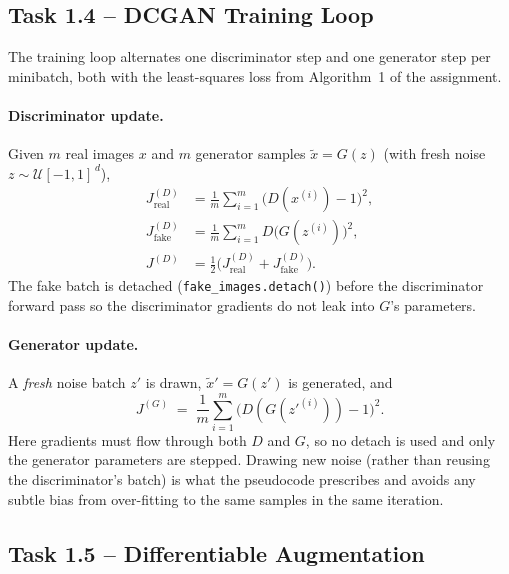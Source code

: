 \documentclass[11pt,a4paper]{article}
\begin{document}

\subsection*{Task 1.4 -- DCGAN Training Loop}

The training loop alternates one discriminator step and one generator
step per minibatch, both with the least-squares loss from
Algorithm~1 of the assignment.

\paragraph{Discriminator update.} Given $m$ real images $x$ and $m$
generator samples $\tilde{x}=G(z)$ (with fresh noise $z\!\sim\!\mathcal{U}[-1,1]^{\,d}$),
\begin{align*}
    J^{(D)}_{\text{real}} &= \frac{1}{m}\sum_{i=1}^{m}\bigl(D(x^{(i)}) - 1\bigr)^{2}, \\
    J^{(D)}_{\text{fake}} &= \frac{1}{m}\sum_{i=1}^{m} D\bigl(G(z^{(i)})\bigr)^{2}, \\
    J^{(D)}                  &= \tfrac{1}{2}\bigl(J^{(D)}_{\text{real}} + J^{(D)}_{\text{fake}}\bigr).
\end{align*}
The fake batch is detached (\verb|fake_images.detach()|) before the
discriminator forward pass so the discriminator gradients do not leak
into $G$'s parameters.

\paragraph{Generator update.} A \emph{fresh} noise batch $z'$ is drawn,
$\tilde{x}'=G(z')$ is generated, and
\[
    J^{(G)} \;=\; \frac{1}{m}\sum_{i=1}^{m}\bigl(D(G(z'^{(i)})) - 1\bigr)^{2}.
\]
Here gradients must flow through both $D$ and $G$, so no detach is used
and only the generator parameters are stepped. Drawing new noise (rather
than reusing the discriminator's batch) is what the pseudocode
prescribes and avoids any subtle bias from over-fitting to the same
samples in the same iteration.

\subsection*{Task 1.5 -- Differentiable Augmentation}
\end{document}
